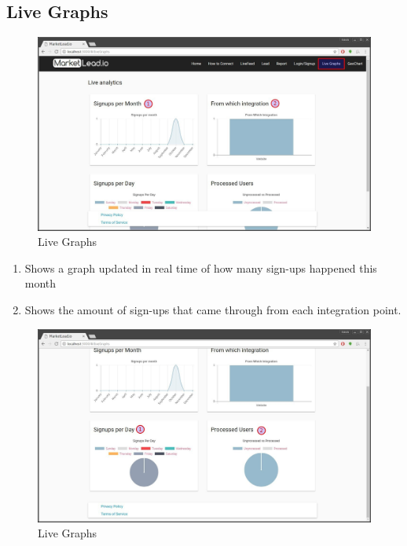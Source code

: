 \documentclass{article}
\begin{document}
		\subsection{Live Graphs}
			\begin{figure}[H]
				\includegraphics[width=\textwidth]{images/live_graph.jpg}
				\caption{Live Graphs}
				\label{fig:liveGraphs}
			\end{figure}

			\begin{enumerate}
				\item Shows a graph updated in real time of how many sign-ups happened this month
				\item Shows the amount of sign-ups that came through from each integration point.
			\end{enumerate}

			\begin{figure}[H]
				\includegraphics[width=\textwidth]{images/live_graph_2.jpg}
				\caption{Live Graphs}
				\label{fig:liveGraphs2}
			\end{figure}
\end{document}
